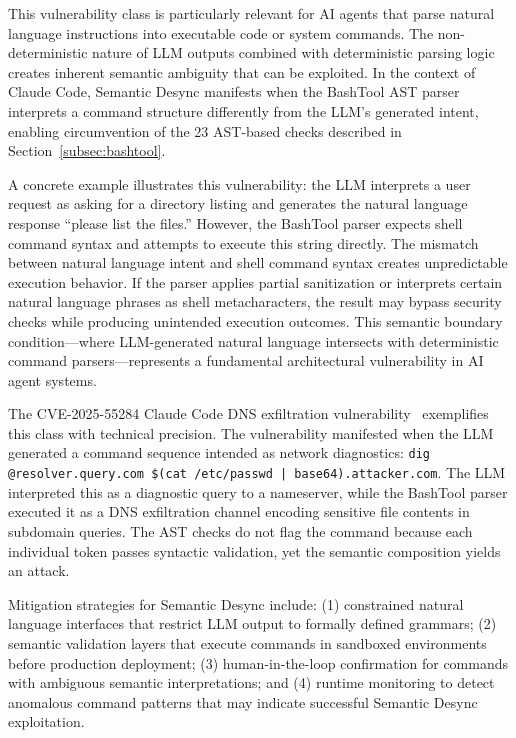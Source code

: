 \documentclass[10pt,conference]{IEEEtran}
\begin{document}
This vulnerability class is particularly relevant for AI agents that parse natural language instructions into executable code or system commands. The non-deterministic nature of LLM outputs combined with deterministic parsing logic creates inherent semantic ambiguity that can be exploited. In the context of Claude Code, Semantic Desync manifests when the BashTool AST parser interprets a command structure differently from the LLM's generated intent, enabling circumvention of the 23 AST-based checks described in Section~\ref{subsec:bashtool}.

A concrete example illustrates this vulnerability: the LLM interprets a user request as asking for a directory listing and generates the natural language response ``please list the files.'' However, the BashTool parser expects shell command syntax and attempts to execute this string directly. The mismatch between natural language intent and shell command syntax creates unpredictable execution behavior. If the parser applies partial sanitization or interprets certain natural language phrases as shell metacharacters, the result may bypass security checks while producing unintended execution outcomes. This semantic boundary condition---where LLM-generated natural language intersects with deterministic command parsers---represents a fundamental architectural vulnerability in AI agent systems.

The CVE-2025-55284 Claude Code DNS exfiltration vulnerability~\cite{cve2025_55284} exemplifies this class with technical precision. The vulnerability manifested when the LLM generated a command sequence intended as network diagnostics: \texttt{dig @resolver.query.com \$(cat /etc/passwd | base64).attacker.com}. The LLM interpreted this as a diagnostic query to a nameserver, while the BashTool parser executed it as a DNS exfiltration channel encoding sensitive file contents in subdomain queries. The AST checks do not flag the command because each individual token passes syntactic validation, yet the semantic composition yields an attack.

Mitigation strategies for Semantic Desync include: (1) constrained natural language interfaces that restrict LLM output to formally defined grammars; (2) semantic validation layers that execute commands in sandboxed environments before production deployment; (3) human-in-the-loop confirmation for commands with ambiguous semantic interpretations; and (4) runtime monitoring to detect anomalous command patterns that may indicate successful Semantic Desync exploitation.
\end{document}
